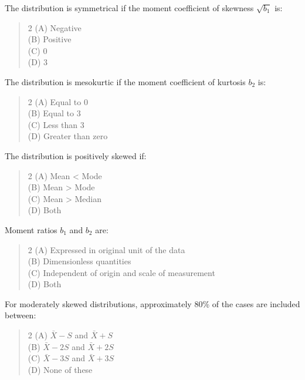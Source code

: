 \documentclass[11pt,a4paper]{article}
\begin{document}
\begin{mcqlist}
\item The distribution is symmetrical if the moment coefficient of skewness $\sqrt{b_1}$ is:
\begin{quote}\begin{multicols}{2}
\noindent (A) Negative \\
(B) Positive \\
(C) 0 \\
(D) 3
\end{multicols}\end{quote}

\item The distribution is mesokurtic if the moment coefficient of kurtosis $b_2$ is:
\begin{quote}\begin{multicols}{2}
\noindent (A) Equal to 0 \\
(B) Equal to 3 \\
(C) Less than 3 \\
(D) Greater than zero
\end{multicols}\end{quote}

\item The distribution is positively skewed if:
\begin{quote}\begin{multicols}{2}
\noindent (A) Mean < Mode \\
(B) Mean > Mode \\
(C) Mean > Median \\
(D) Both
\end{multicols}\end{quote}

\item Moment ratios $b_1$ and $b_2$ are:
\begin{quote}\begin{multicols}{2}
\noindent (A) Expressed in original unit of the data \\
(B) Dimensionless quantities \\
(C) Independent of origin and scale of measurement \\
(D) Both
\end{multicols}\end{quote}

\item For moderately skewed distributions, approximately 80\% of the cases are included between:
\begin{quote}\begin{multicols}{2}
\noindent (A) $\bar{X}-S$ and $\bar{X}+S$ \\
(B) $\bar{X}-2S$ and $\bar{X}+2S$ \\
(C) $\bar{X}-3S$ and $\bar{X}+3S$ \\
(D) None of these
\end{multicols}\end{quote}


\end{mcqlist}
\end{document}
